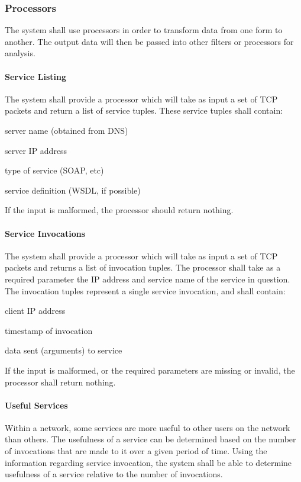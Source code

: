 \documentclass[titlepage]{article}
\begin{document}

\subsubsection{Processors}

The system shall use processors in order to transform data from one
form to another.  The output data will then be passed into other filters or
processors for analysis.

\paragraph{Service Listing}

The system shall provide a processor which will take as input a set of TCP
packets and return a list of service tuples.  These service tuples shall
contain:
\begin{itemize*}
    \item server name (obtained from DNS)
    \item server IP address
    \item type of service (SOAP, etc)
    \item service definition (WSDL, if possible)
\end{itemize*}
If the input is malformed, the processor should return nothing.

\paragraph{Service Invocations}

The system shall provide a processor which will take as input a set of TCP
packets and returns a list of invocation tuples.  The processor shall take as a
required parameter the IP address and service name of the service in question.
The invocation tuples represent a single service invocation, and shall contain:
\begin{itemize*}
    \item client IP address
    \item timestamp of invocation
    \item data sent (arguments) to service
\end{itemize*}
If the input is malformed, or the required parameters are missing or invalid,
the processor shall return nothing.

\paragraph{Useful Services} 
Within a network, some services are more useful to other users on the network
than others. The usefulness of a service can be determined based on the number
of invocations that are made to it over a given period of time.  Using the
information regarding service invocation, the system shall be able to determine
usefulness of a service relative to the number of invocations.
\end{document}
